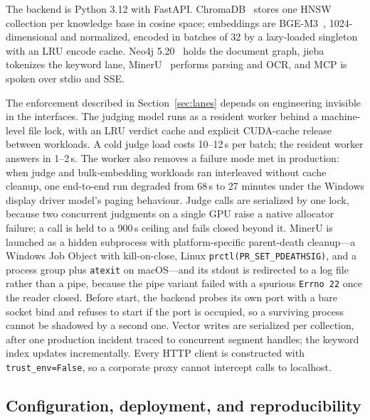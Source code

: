The backend is Python 3.12 with FastAPI. ChromaDB~\cite{chroma} stores one
HNSW~\cite{hnsw} collection per knowledge base in cosine space; embeddings
are BGE-M3~\cite{bge-m3}, 1024-dimensional and normalized, encoded in
batches of 32 by a lazy-loaded singleton with an LRU encode cache. Neo4j
5.20~\cite{neo4j} holds the document graph, jieba~\cite{jieba} tokenizes the
keyword lane, MinerU~\cite{mineru} performs parsing and OCR, and MCP is
spoken over stdio and SSE.

The enforcement described in Section~\ref{sec:lanes} depends on engineering
invisible in the interfaces. The judging model runs as a resident worker
behind a machine-level file lock, with an LRU verdict cache and explicit
CUDA-cache release between workloads. A cold judge load costs 10--12\,s per
batch; the resident worker answers in 1--2\,s. The worker also removes a
failure mode met in production: when judge and bulk-embedding workloads ran
interleaved without cache cleanup, one end-to-end run degraded from 68\,s to
27 minutes under the Windows display driver model's paging behaviour. Judge
calls are serialized by one lock, because two concurrent judgments on a
single GPU raise a native allocator failure; a call is held to a 900\,s
ceiling and fails closed beyond it. MinerU
is launched as a hidden subprocess with platform-specific parent-death
cleanup---a Windows Job Object with kill-on-close, Linux
\texttt{prctl(PR\_SET\_PDEATHSIG)}, and a process group plus
\texttt{atexit} on macOS---and its stdout is redirected to a log file rather
than a pipe, because the pipe variant failed with a spurious
\texttt{Errno 22} once the reader closed. Before start, the backend probes
its own port with a bare socket bind and refuses to start if the port is
occupied, so a surviving process cannot be shadowed by a second one. Vector
writes are serialized per collection, after one production incident traced
to concurrent segment handles; the keyword index updates incrementally.
Every HTTP client is constructed with \texttt{trust\_env=False}, so a
corporate proxy cannot intercept calls to localhost.

\subsection{Configuration, deployment, and reproducibility}
\label{sec:impl-deploy}

